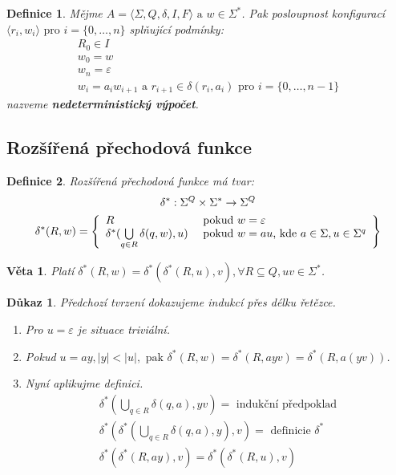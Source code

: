 \documentclass[10pt, a4paper, titlepage]{article}
\theoremstyle{note}
\newtheorem{veta}{Věta}
\newtheorem{definice}{Definice}
\newtheorem{dukaz}{Důkaz}
\begin{document}
\begin{definice}
Mějme $A = \langle \Sigma, Q, \delta, I, F \rangle  \text{ a } w \in \Sigma^{*}$. Pak posloupnost konfigurací $\langle r_{i}, w_{i} \rangle \text{ pro } i = \lbrace 0, \ldots, n \rbrace $ splňující podmínky:
\begin{gather}
R_{0} \in I \\
w_{0} = w \\
w_{n} = \varepsilon \\
w_{i} = a_{i}w_{i+1} \text{ a } r_{i+1} \in \delta (r_{i}, a_{i}) \text{ pro } i = \lbrace 0, \ldots,  n-1 \rbrace
\end{gather}
nazveme \textbf{nedeterministický výpočet}.
\end{definice}

\subsection{Rozšířená přechodová funkce}
\begin{definice}
Rozšířená přechodová funkce má tvar:
\begin{gather*}
\delta^{*} : \Sigma^{Q} \times \Sigma^{*} \rightarrow \Sigma^{Q} \\
\delta^{*}(R, w) = \left\lbrace
\begin{array}{l l}
R & \text{ pokud } w = \varepsilon \\
\delta^{*}(\bigcup\limits_{q \in R} \delta(q, w), u) & \text{ pokud } w = au\text{, kde } a \in \Sigma, u \in \Sigma^{q} \\
\end{array}
\right\rbrace
\end{gather*}
\end{definice}

\begin{veta}
Platí $\delta^{*}(R,w) = \delta^{*}(\delta^{*}(R,u),v), \forall R \subseteq Q, uv \in \Sigma^{*}$.
\end{veta}
\begin{dukaz}
Předchozí tvrzení dokazujeme indukcí přes délku řetězce.

\begin{enumerate}
\item
Pro $u = \varepsilon$ je situace triviální.

\item
Pokud $u = ay, |y| < |u|,\text{ pak } \delta^{*}(R,w) = \delta^{*}(R,ayv) = \delta^{*}(R,a(yv))$.

\item
Nyní aplikujme definici.
\begin{gather*}
\delta^{*}(\bigcup\limits_{q \in R} \delta(q, a), yv) = \text{ indukční předpoklad} \\
\delta^{*}(\delta^{*}(\bigcup\limits_{q \in R} \delta(q, a), y), v) = \text{ definicie } \delta^{*} \\
\delta^{*}(\delta^{*}(R, ay), v) = \delta^{*}(\delta^{*}(R,u),v)
\end{gather*}
\end{enumerate}
\end{dukaz}
\end{document}
